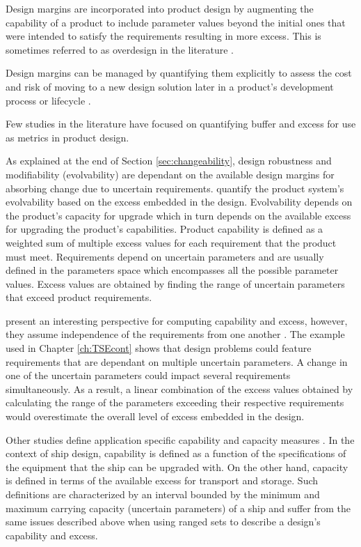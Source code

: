 Design margins are incorporated into product design by augmenting the capability of a product to include parameter values beyond the initial ones that were intended to satisfy the requirements resulting in more excess. This is sometimes referred to as overdesign in the literature \cite{Eckert2019}.

Design margins can be managed by quantifying them explicitly to assess the cost and risk of moving to a new design solution later in a product's development process or lifecycle \cite{Eckert2019}.

Few studies in the literature have focused on quantifying buffer and excess for use as metrics in product design.

As explained at the end of Section \ref{sec:changeability}, design robustness and modifiability (evolvability) are dependant on the available design margins for absorbing change due to uncertain requirements. \citeauthor{Tackett2014} quantify the product system's evolvability based on the excess embedded in the design. Evolvability depends on the product's capacity for upgrade which in turn depends on the available excess for upgrading the product's capabilities. Product capability is defined as a weighted sum of multiple excess values for each requirement that the product must meet. Requirements depend on uncertain parameters and are usually defined in the parameters space which encompasses all the possible parameter values. Excess values are obtained by finding the range of uncertain parameters that exceed product requirements.

\citeauthor{Tackett2014} present an interesting perspective for computing capability and excess, however, they assume independence of the requirements from one another \cite{Tackett2014}. The example used in Chapter \ref{ch:TSEcont} shows that design problems could feature requirements that are dependant on multiple uncertain parameters. A change in one of the uncertain parameters could impact several requirements simultaneously. As a result, a linear combination of the excess values obtained by calculating the range of the parameters exceeding their respective requirements would overestimate the overall level of excess embedded in the design.

Other studies define application specific capability and capacity measures \cite{Rehn2018}. In the context of ship design, capability is defined as a function of the specifications of the equipment that the ship can be upgraded with. On the other hand, capacity is defined in terms of the available excess for transport and storage. Such definitions are characterized by an interval bounded by the minimum and maximum carrying capacity (uncertain parameters) of a ship and suffer from the same issues described above when using ranged sets to describe a design's capability and excess.

